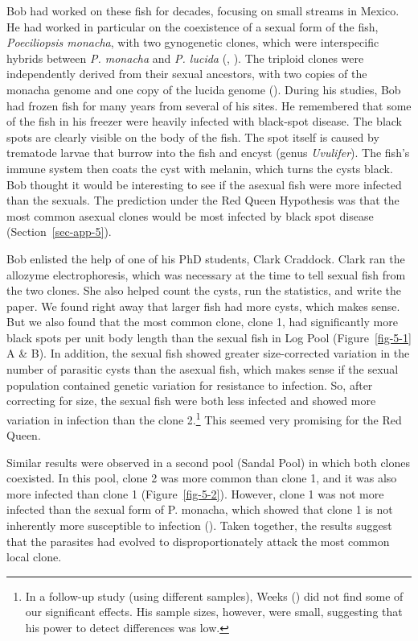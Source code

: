 \documentclass[
  letterpaper,
]{book}
\begin{document}
Bob had worked on these fish for decades, focusing on small streams in
Mexico. He had worked in particular on the coexistence of a sexual form
of the fish, \emph{Poeciliopsis monacha}, with two gynogenetic clones,
which were interspecific hybrids between \emph{P. monacha} and \emph{P.
lucida} (,
). The triploid clones were
independently derived from their sexual ancestors, with two copies of
the monacha genome and one copy of the lucida genome
(). During his studies, Bob had
frozen fish for many years from several of his sites. He remembered that
some of the fish in his freezer were heavily infected with black-spot
disease. The black spots are clearly visible on the body of the fish.
The spot itself is caused by trematode larvae that burrow into the fish
and encyst (genus \emph{Uvulifer}). The fish's immune system then coats
the cyst with melanin, which turns the cysts black. Bob thought it would
be interesting to see if the asexual fish were more infected than the
sexuals. The prediction under the Red Queen Hypothesis was that the most
common asexual clones would be most infected by black spot disease
(Section~\ref{sec-app-5}).

Bob enlisted the help of one of his PhD students, Clark Craddock. Clark
ran the allozyme electrophoresis, which was necessary at the time to
tell sexual fish from the two clones. She also helped count the cysts,
run the statistics, and write the paper. We found right away that larger
fish had more cysts, which makes sense. But we also found that the most
common clone, clone 1, had significantly more black spots per unit body
length than the sexual fish in Log Pool (Figure~\ref{fig-5-1} A \& B).
In addition, the sexual fish showed greater size-corrected variation in
the number of parasitic cysts than the asexual fish, which makes sense
if the sexual population contained genetic variation for resistance to
infection. So, after correcting for size, the sexual fish were both less
infected and showed more variation in infection than the clone
2.\footnote{In a follow-up study (using different samples), Weeks
  () did not find some of our significant
  effects. His sample sizes, however, were small, suggesting that his
  power to detect differences was low.} This seemed very promising for
the Red Queen.

Similar results were observed in a second pool (Sandal Pool) in which
both clones coexisted. In this pool, clone 2 was more common than clone
1, and it was also more infected than clone 1 (Figure~\ref{fig-5-2}).
However, clone 1 was not more infected than the sexual form of P.
monacha, which showed that clone 1 is not inherently more susceptible to
infection (). Taken
together, the results suggest that the parasites had evolved to
disproportionately attack the most common local clone.
\end{document}
